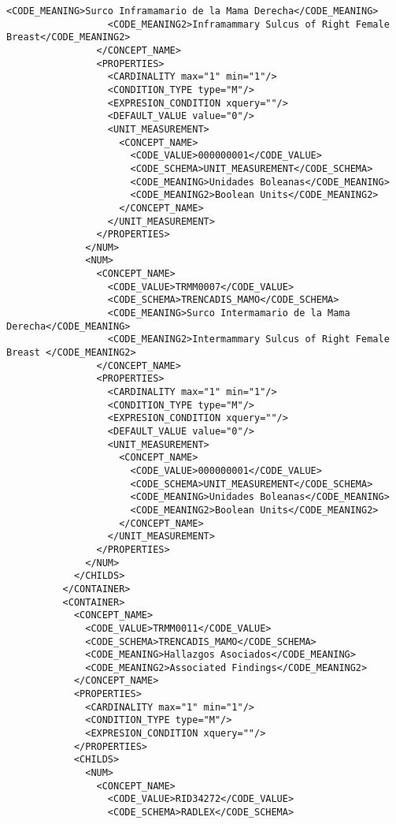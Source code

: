 \begin{lstlisting}[label=some-code,caption=Some Code]
                  <CODE_MEANING>Surco Inframamario de la Mama Derecha</CODE_MEANING>
                  <CODE_MEANING2>Inframammary Sulcus of Right Female Breast</CODE_MEANING2>
                </CONCEPT_NAME>
                <PROPERTIES>
                  <CARDINALITY max="1" min="1"/>
                  <CONDITION_TYPE type="M"/>
                  <EXPRESION_CONDITION xquery=""/>
                  <DEFAULT_VALUE value="0"/>
                  <UNIT_MEASUREMENT>
                    <CONCEPT_NAME>
                      <CODE_VALUE>000000001</CODE_VALUE>
                      <CODE_SCHEMA>UNIT_MEASUREMENT</CODE_SCHEMA>
                      <CODE_MEANING>Unidades Boleanas</CODE_MEANING>
                      <CODE_MEANING2>Boolean Units</CODE_MEANING2>
                    </CONCEPT_NAME>
                  </UNIT_MEASUREMENT>
                </PROPERTIES>
              </NUM>
              <NUM>
                <CONCEPT_NAME>
                  <CODE_VALUE>TRMM0007</CODE_VALUE>
                  <CODE_SCHEMA>TRENCADIS_MAMO</CODE_SCHEMA>
                  <CODE_MEANING>Surco Intermamario de la Mama Derecha</CODE_MEANING>
                  <CODE_MEANING2>Intermammary Sulcus of Right Female Breast </CODE_MEANING2>
                </CONCEPT_NAME>
                <PROPERTIES>
                  <CARDINALITY max="1" min="1"/>
                  <CONDITION_TYPE type="M"/>
                  <EXPRESION_CONDITION xquery=""/>
                  <DEFAULT_VALUE value="0"/>
                  <UNIT_MEASUREMENT>
                    <CONCEPT_NAME>
                      <CODE_VALUE>000000001</CODE_VALUE>
                      <CODE_SCHEMA>UNIT_MEASUREMENT</CODE_SCHEMA>
                      <CODE_MEANING>Unidades Boleanas</CODE_MEANING>
                      <CODE_MEANING2>Boolean Units</CODE_MEANING2>
                    </CONCEPT_NAME>
                  </UNIT_MEASUREMENT>
                </PROPERTIES>
              </NUM>
            </CHILDS>
          </CONTAINER>
          <CONTAINER>
            <CONCEPT_NAME>
              <CODE_VALUE>TRMM0011</CODE_VALUE>
              <CODE_SCHEMA>TRENCADIS_MAMO</CODE_SCHEMA>
              <CODE_MEANING>Hallazgos Asociados</CODE_MEANING>
              <CODE_MEANING2>Associated Findings</CODE_MEANING2>
            </CONCEPT_NAME>
            <PROPERTIES>
              <CARDINALITY max="1" min="1"/>
              <CONDITION_TYPE type="M"/>
              <EXPRESION_CONDITION xquery=""/>
            </PROPERTIES>
            <CHILDS>
              <NUM>
                <CONCEPT_NAME>
                  <CODE_VALUE>RID34272</CODE_VALUE>
                  <CODE_SCHEMA>RADLEX</CODE_SCHEMA>

\end{lstlisting}
